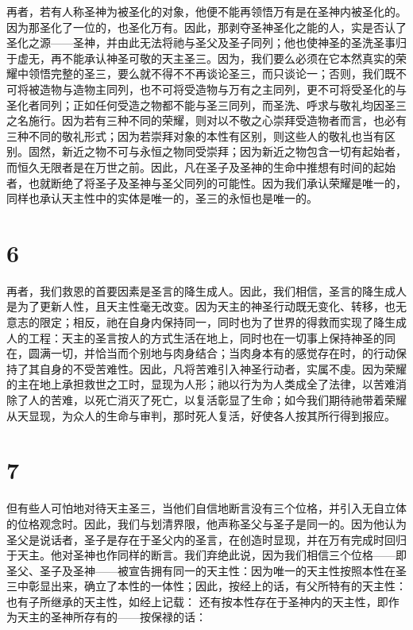再者，若有人称圣神为被圣化的对象，他便不能再领悟万有是在圣神内被圣化的。因为那圣化了一位的，也圣化万有。因此，那剥夺圣神圣化之能的人，实是否认了圣化之源——圣神，并由此无法将祂与圣父及圣子同列；他也使神圣的圣洗圣事归于虚无，再不能承认神圣可敬的天主圣三。因为，我们要么必须在它本然真实的荣耀中领悟完整的圣三，要么就不得不不再谈论圣三，而只谈论一；否则，我们既不可将被造物与造物主同列，也不可将受造物与万有之主同列，更不可将受圣化的与圣化者同列；正如任何受造之物都不能与圣三同列，而圣洗、呼求与敬礼均因圣三之名施行。因为若有三种不同的荣耀，则对以不敬之心崇拜受造物者而言，也必有三种不同的敬礼形式；因为若崇拜对象的本性有区别，则这些人的敬礼也当有区别。固然，新近之物不可与永恒之物同受崇拜；因为新近之物包含一切有起始者，而恒久无限者是在万世之前。因此，凡在圣子及圣神的生命中推想有时间的起始者，也就断绝了将圣子及圣神与圣父同列的可能性。因为我们承认荣耀是唯一的，同样也承认天主性中的实体是唯一的，圣三的永恒也是唯一的。\par


\section{6}

再者，我们救恩的首要因素是圣言的降生成人。因此，我们相信，圣言的降生成人是为了更新人性，且天主性毫无改变。因为天主的神圣行动既无变化、转移，也无意志的限定；相反，祂在自身内保持同一，同时也为了世界的得救而实现了降生成人的工程：天主的圣言按人的方式生活在地上，同时也在一切事上保持神圣的同在，圆满一切，并恰当而个别地与肉身结合；当肉身本有的感觉存在时，的行动保持了其自身的不受苦难性。因此，凡将苦难引入神圣行动者，实属不虔。因为荣耀的主在地上承担救世之工时，显现为人形；祂以行为为人类成全了法律，以苦难消除了人的苦难，以死亡消灭了死亡，以复活彰显了生命；如今我们期待祂带着荣耀从天显现，为众人的生命与审判，那时死人复活，好使各人按其所行得到报应。\par


\section{7}

但有些人可怕地对待天主圣三，当他们自信地断言没有三个位格，并引入无自立体的位格观念时。因此，我们与划清界限，他声称圣父与圣子是同一的。因为他认为圣父是说话者，圣子是存在于圣父内的圣言，在创造时显现，并在万有完成时回归于天主。他对圣神也作同样的断言。我们弃绝此说，因为我们相信三个位格——即圣父、圣子及圣神——被宣告拥有同一的天主性：因为唯一的天主性按照本性在圣三中彰显出来，确立了本性的一体性；因此，按经上的话，有父所特有的天主性：  也有子所继承的天主性，如经上记载：  还有按本性存在于圣神内的天主性，即作为天主的圣神所存有的——按保禄的话： \par

